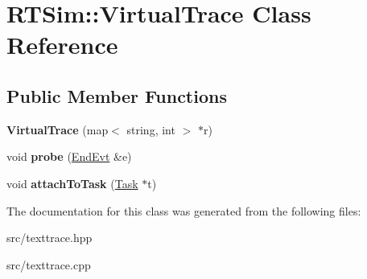 \hypertarget{classRTSim_1_1VirtualTrace}{}\section{R\+T\+Sim\+:\+:Virtual\+Trace Class Reference}
\label{classRTSim_1_1VirtualTrace}
\subsection*{Public Member Functions}
\begin{DoxyCompactItemize}
\item 
{\bfseries Virtual\+Trace} (map$<$ string, int $>$ $\ast$r)\hypertarget{classRTSim_1_1VirtualTrace_af2b2ec089d8f30a2602fa743cf744742}{}\label{classRTSim_1_1VirtualTrace_af2b2ec089d8f30a2602fa743cf744742}

\item 
void {\bfseries probe} (\hyperlink{classRTSim_1_1EndEvt}{End\+Evt} \&e)\hypertarget{classRTSim_1_1VirtualTrace_a70d4c9141b5c086d62fa6ab1aa388508}{}\label{classRTSim_1_1VirtualTrace_a70d4c9141b5c086d62fa6ab1aa388508}

\item 
void {\bfseries attach\+To\+Task} (\hyperlink{classRTSim_1_1Task}{Task} $\ast$t)\hypertarget{classRTSim_1_1VirtualTrace_a9fd2db740d1997a124d9127f2833a479}{}\label{classRTSim_1_1VirtualTrace_a9fd2db740d1997a124d9127f2833a479}

\end{DoxyCompactItemize}


The documentation for this class was generated from the following files\+:\begin{DoxyCompactItemize}
\item 
src/texttrace.\+hpp\item 
src/texttrace.\+cpp\end{DoxyCompactItemize}
